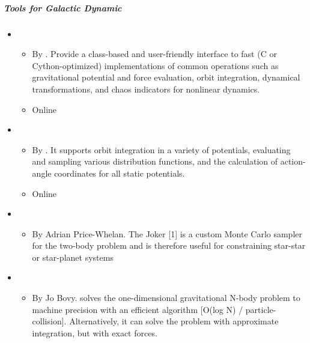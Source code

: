 \documentclass[letterpaper,10pt,english]{sphinxmanual}
\begin{document}
\subparagraph{Tools for Galactic Dynamic}
\label{\detokenize{resource/astro/topics/galactic_astronomy:tools-for-galactic-dynamic}}\begin{itemize}
\item {} 
\begin{itemize}
\item {} 
By . Provide a
class-based and user-friendly interface to fast (C or
Cython-optimized) implementations of common operations such as
gravitational potential and force evaluation, orbit integration,
dynamical transformations, and chaos indicators for nonlinear
dynamics.

\item {} 
Online 

\end{itemize}

\item {} 
\begin{itemize}
\item {} 
By . It supports
orbit integration in a variety of potentials, evaluating and
sampling various distribution functions, and the calculation of
action-angle coordinates for all static potentials.

\item {} 
Online 

\end{itemize}

\item {} 
\begin{itemize}
\item {} 
By Adrian Price-Whelan. The Joker {[}1{]} is a custom Monte Carlo
sampler for the two-body problem and is therefore useful for
constraining star-star or star-planet systems

\end{itemize}

\item {} 
\begin{itemize}
\item {} 
By Jo Bovy.  solves the one-dimensional gravitational
N-body problem to machine precision with an efficient algorithm
{[}O(log N) / particle-collision{]}. Alternatively, it can solve the
problem with approximate integration, but with exact forces.


\end{itemize}
\end{itemize}
\end{document}
